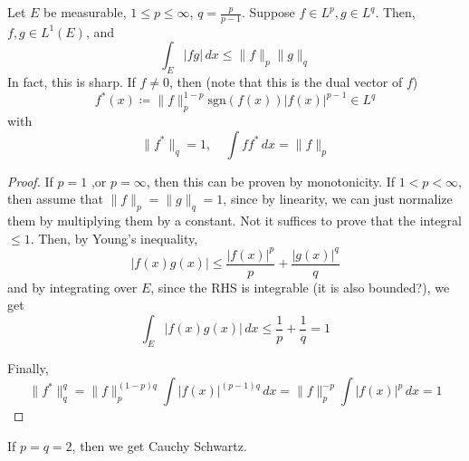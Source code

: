   \begin{theorem}[Holder]
    Let $E$ be measurable, $1 \leq p \leq \infty$, $q = \frac{p}{p-1}$. Suppose $f \in L^p, g \in L^q$. Then, $f, g \in L^1 (E)$, and 
    \begin{equation}
      \int_E |fg| \,dx \leq \|f\|_p \|g\|_q
    \end{equation}
    In fact, this is sharp. If $f \neq 0$, then (note that this is the dual vector of $f$)
    \begin{equation}
      f^\ast (x) \coloneqq \|f\|_p^{1 - p} \mathrm{sgn}(f(x)) |f(x)|^{p-1} \in L^q
    \end{equation}
    with 
    \begin{equation}
      \|f^\ast \|_q = 1, \quad \int f f^\ast \,dx = \|f\|_p
    \end{equation}
  \end{theorem}
  \begin{proof}
    If $p =1$ ,or $p = \infty$, then this can be proven by monotonicity. If $1 < p < \infty$, then assume that $\|f\|_p = \|g\|_q = 1$, since by linearity, we can just normalize them by multiplying them by a constant. Not it suffices to prove that the integral $\leq 1$. Then, by Young's inequality,
    \begin{equation}
      |f(x) g(x)| \leq \frac{|f(x)|^p}{p} + \frac{|g(x)|^q}{q}
    \end{equation}
    and by integrating over $E$, since the RHS is integrable (it is also bounded?), we get 
    \begin{equation}
      \int_E |f(x) g(x)| \,dx \leq \frac{1}{p} + \frac{1}{q} = 1
    \end{equation}

    Finally, 
    \begin{equation}
      \|f^\ast\|_q^q = \|f\|_p^{(1-p) q} \int |f(x)|^{(p-1)q} \,dx = \|f\|_p^{-p} \int |f(x)|^p \,dx = 1
    \end{equation}
  \end{proof}

  \begin{corollary}
    If $p = q = 2$, then we get Cauchy Schwartz. 
  \end{corollary}

